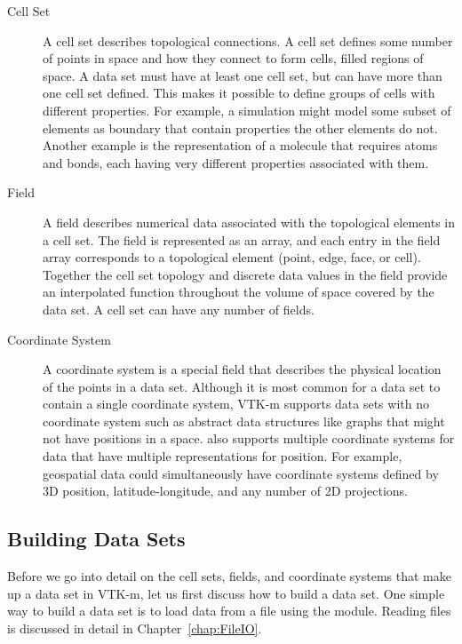 \begin{description}
\item[Cell Set]  A cell set describes topological
  connections. A cell set defines some number of points in space and how
  they connect to form cells, filled regions of space. A data set must have
  at least one cell set, but can have more than one cell set defined. This
  makes it possible to define groups of cells with different properties.
  For example, a simulation might model some subset of elements as boundary
  that contain properties the other elements do not. Another example is the
  representation of a molecule that requires atoms and bonds, each having
  very different properties associated with them.
\item[Field]  A field describes numerical data associated with
  the topological elements in a cell set. The field is represented as an
  array, and each entry in the field array corresponds to a topological
  element (point, edge, face, or cell). Together the cell set topology and
  discrete data values in the field provide an interpolated function
  throughout the volume of space covered by the data set. A cell set can
  have any number of fields.
\item[Coordinate System]  A coordinate system is a
  special field that describes the physical location of the points in a
  data set. Although it is most common for a data set to contain a single
  coordinate system, VTK-m supports data sets with no coordinate system
  such as abstract data structures like graphs that might not have
  positions in a space.  also supports multiple
  coordinate systems for data that have multiple representations for
  position. For example, geospatial data could simultaneously have
  coordinate systems defined by 3D position, latitude-longitude, and any
  number of 2D projections.
\end{description}

\subsection{Building Data Sets}
\label{sec:DataSets:Building}


Before we go into detail on the cell sets, fields, and coordinate systems
that make up a data set in VTK-m, let us first discuss how to build a data
set. One simple way to build a data set is to load data from a file using
the \vtkmio{} module. Reading files is discussed in detail in
Chapter~\ref{chap:FileIO}.

